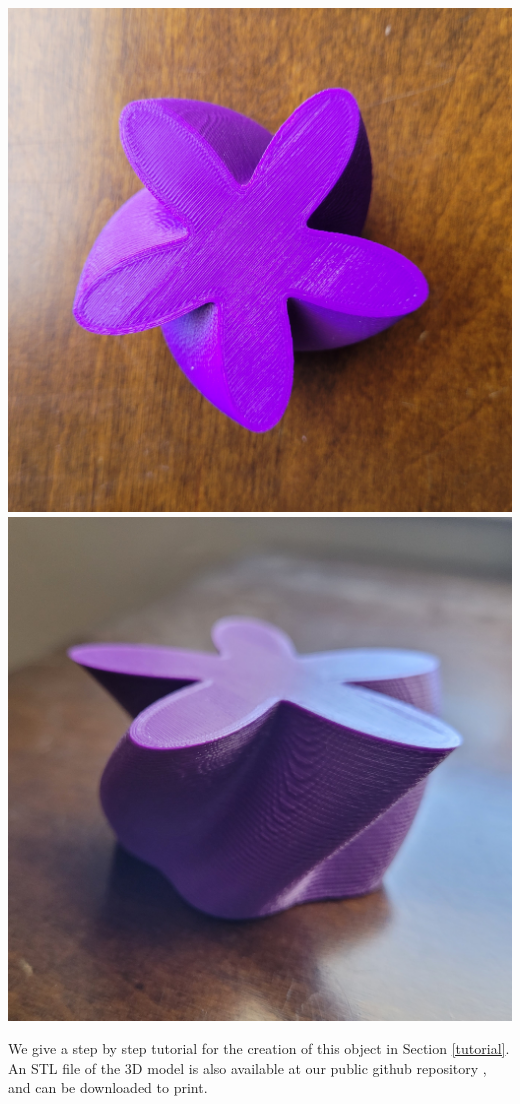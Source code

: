 \documentclass[12 pt]{article}
\begin{document}
\begin{center}
    \includegraphics[width=.3\paperwidth]{images/flowerTop.jpg}\hspace{10pt}\includegraphics[width=.3\paperwidth]{images/flowerSide.jpg}
\end{center}
We give a step by step tutorial for the creation of this object in Section \ref{tutorial}.  An STL file of the 3D model is also available at our public github repository \cite{github}, and can be downloaded to print.\\
\end{document}
